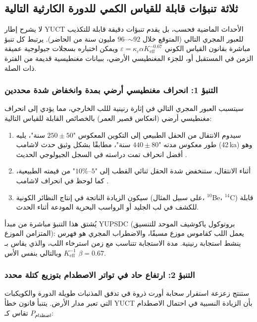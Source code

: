 \documentclass[11pt,a4paper]{article}
\begin{document}
	\subsection{ثلاثة تنبؤات قابلة للقياس الكمي للدورة الكارثية التالية}
	
	لا يشرح إطار YUCT الأحداث الماضية فحسب، بل يقدم تنبؤات دقيقة قابلة للتكذيب للعبور المجري التالي (المتوقع خلال \(\sim 92\)–\(96\) مليون سنة من الحاضر). يرتبط كل تنبؤ مباشرة بقانون القياس الكوني \(\varepsilon = \kappa_c \alpha K_{\mathrm{eff}}^{-0.67}\) ويمكن اختباره بسجلات جيولوجية عميقة الزمن في المستقبل أو، للجزء المغنطيسي الأرضي، ببيانات مغنطيسية قديمة من الفترة ذات الصلة.
	
	\subsubsection{التنبؤ 1: انحراف مغنطيسي أرضي بمدة وانخفاض شدة محددين}
	
	سيتسبب العبور المجري التالي في إثارة رنينية لللب الخارجي، مما يؤدي إلى انحراف مغنطيسي أرضي (انعكاس قصير العمر) بالخصائص القابلة للقياس التالية:
	
	\begin{enumerate}
		\item سيدوم الانتقال من الحقل الطبيعي إلى التكوين المعكوس "\(250 \pm 50\) سنة"، يليه طور معكوس مدته "\(440 \pm 80\) سنة"، مطابقًا بشكل وثيق حدث لاشامب (42 ka) وهو أفضل انحراف تمت دراسته في السجل الجيولوجي الحديث \cite{Laschamp}.
		\item أثناء الانتقال، ستنخفض شدة الحقل ثنائي القطب إلى "\(5\)–\(10\%\)" من قيمته الطبيعية، كما لوحظ في انحراف لاشامب \cite{Laschamp}.
		\item سيكون الزيادة الناتجة في إنتاج النظائر الكونية (على سبيل المثال، \(^{10}\)Be، \(^{14}\)C) قابلة للكشف في لب الجليد أو الرواسب البحرية المودعة أثناء الحدث.
	\end{enumerate}
	
	يُشتق هذا التنبؤ مباشرة من مبدأ YUPSDC (بروتوكول ياكوشيف الموحد للتنسيق المتزامن الموزع): يعمل اللب كقاموس موزع مسبقًا، والاضطراب المجري هو فهرس ينشط استجابة رنينية. مدة الاستجابة تتناسب مع زمن استرخاء اللب، والذي يقاس بـ \(K_{\mathrm{eff}}^{-1}\) وبالتالي بنفس الأس \(\beta=0.67\).
	
	\subsubsection{التنبؤ 2: ارتفاع حاد في تواتر الاصطدام بتوزيع كتلة محدد}
	
	ستنتج زعزعة استقرار سحابة أورت ذروة في تدفق المذنبات طويلة الدورة والكويكبات التي تعبر مدار الأرض. يتنبأ قانون خطأ YUCT بأن الزيادة النسبية في احتمال الاصطدام \(P_{\text{اصطدام}}\) تقاس كـ:
	
\end{document}
